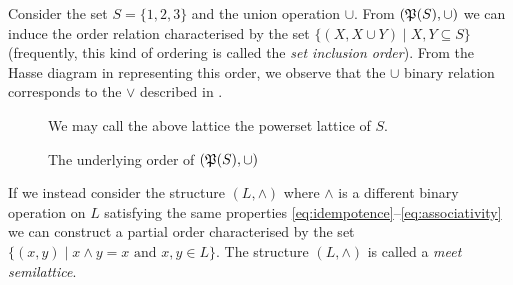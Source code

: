 \begin{example}
  \label{example:power-set-lattice} Consider the set $S = \{1,2,3\}$ and the union operation $\cup$.
  From $(\mathfrak{P}({S}), \cup)$ we can induce the order relation characterised by the set
  $\{(X, X \cup Y) \mid X,Y \subseteq S \}$ (frequently, this kind of ordering is called the \textit{set
  inclusion order}). From the Hasse diagram in  representing this order,
  we observe that the $\cup$ binary relation corresponds to the $\vee$ described in
  .
  \begin{figure}[H]
    \centering
    \caption{The underlying order of $(\mathfrak{P}({S}), \cup)$}
    \label{figure:set-inclusion-order}

    We may call the above lattice the powerset lattice of $S$.
  \end{figure}
\end{example}

If we instead consider the structure $(L, \wedge)$ where $\wedge$ is a different binary operation on
$L$ satisfying the same properties \cref{eq:idempotence}--\cref{eq:associativity} we can construct a
partial order characterised by the set $\{(x,y) \mid x \wedge y = x \text{ and }x,y \in L\}$. The structure
$(L, \wedge)$ is called a \textit{meet semilattice}.

